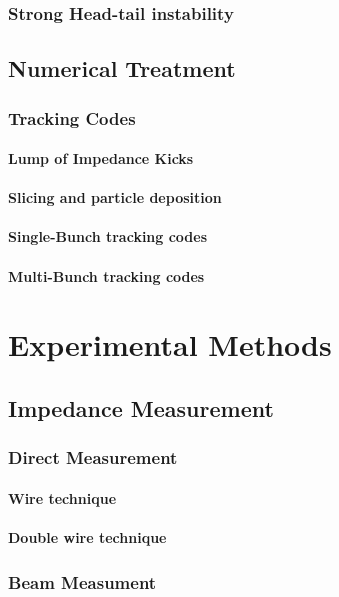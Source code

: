 \documentclass[
	12pt,				%
	openright,			%
	oneside,			%
	a4paper,		%
	chapter=TITLE,		%
	section=TITLE,		%
    brazil,				%
	english,			%
	sumario=tradicional,
	]{abntex2}
\begin{document}
    \subsection{Strong Head-tail instability}
  \section{Numerical Treatment}
    \subsection{Tracking Codes}
      \subsubsection{Lump of Impedance Kicks}
      \subsubsection{Slicing and particle deposition}
      \subsubsection{Single-Bunch tracking codes}
      \subsubsection{Multi-Bunch tracking codes}


\chapter{Experimental Methods}
  \section{Impedance Measurement}
    \subsection{Direct Measurement}
      \subsubsection{Wire technique}
      \subsubsection{Double wire technique}
    \subsection{Beam Measument}
\end{document}
